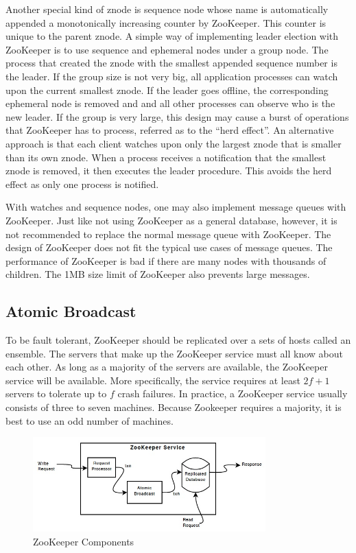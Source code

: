 \documentclass[12pt]{book}
\begin{document}
Another special kind of znode is sequence node whose name is automatically appended a monotonically increasing counter by ZooKeeper. This counter is unique to the parent znode. A simple way of implementing leader election with ZooKeeper is to use sequence and ephemeral nodes under a group node. The process that created the znode with the smallest appended sequence number is the leader. If the group size is not very big, all application processes can watch upon the current smallest znode. If the leader goes offline, the corresponding ephemeral node is removed and and all other processes can observe who is the new leader. If the group is very large, this design may cause a burst of operations that ZooKeeper has to process, referred as to the ``herd effect''. An alternative approach is that each client watches upon only the largest znode that is smaller than its own znode. When a process receives a notification that the smallest znode is removed, it then executes the leader procedure. This avoids the herd effect as only one process is notified.

With watches and sequence nodes, one may also implement message queues with ZooKeeper. Just like not using ZooKeeper as a general database, however, it is not recommended to replace the normal message queue with ZooKeeper. The design of ZooKeeper does not fit the typical use cases of message queues. The performance of ZooKeeper is bad if there are many nodes with thousands of children. The 1MB size limit of ZooKeeper also prevents large messages.

\subsection{Atomic Broadcast}
To be fault tolerant, ZooKeeper should be replicated over a sets of hosts called an ensemble. The servers that make up the ZooKeeper service must all know about each other. As long as a majority of the servers are available, the ZooKeeper service will be available. More specifically, the service requires at least $2f+1$ servers to tolerate up to $f$ crash failures. In practice, a ZooKeeper service usually consists of three to seven machines. Because Zookeeper requires a majority, it is best to use an odd number of machines.

\begin{figure}[t]
\includegraphics[width=0.8\textwidth]{images/zookeeper.jpg}
\centering
\caption{ZooKeeper Components}
\end{figure}
\end{document}
